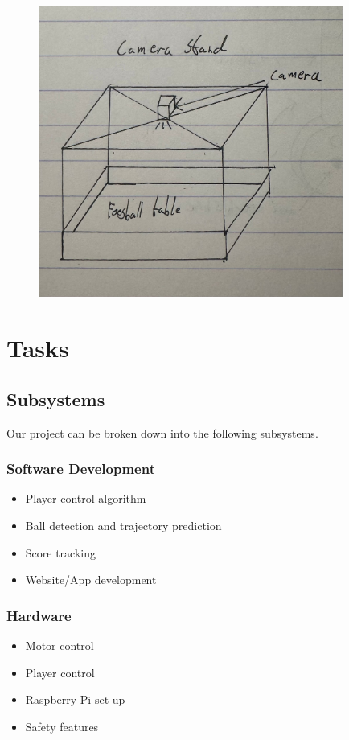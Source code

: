 \documentclass{article}
\begin{document}
 \begin{figure}[!b]
    \centering
    \includegraphics[width=10cm]{figs/design4.jpg}
    \caption{}
    \label{fig:1}
\end{figure}

\section{Tasks}
\subsection{Subsystems}
Our project can be broken down into the following subsystems.
\subsubsection{Software Development}
\begin{itemize}
    \item Player control algorithm
    \item Ball detection and trajectory prediction
    \item Score tracking
    \item Website/App development
\end{itemize}
\subsubsection{Hardware}
\begin{itemize}
    \item Motor control
    \item Player control
    \item Raspberry Pi set-up
    \item Safety features
\end{itemize}
\end{document}
